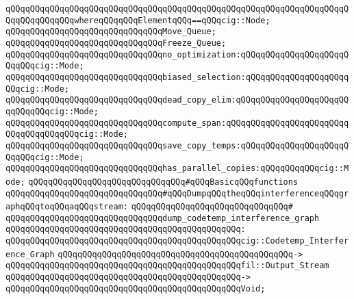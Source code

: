\verb|qQQqqQQqqQQqqQQqqQQqqQQqqQQqqQQqqQQqqQQqqQQqqQQqqQQqqQQqqQQqqQQqqQQqqQQqqQQqqQQqqQQqwhereqQQqqQQqElementqQQq==qQQqcig::Node;|\newline
\newline
\verb|qQQqqQQqqQQqqQQqqQQqqQQqqQQqqQQqMove_Queue;|\newline
\verb|qQQqqQQqqQQqqQQqqQQqqQQqqQQqqQQqFreeze_Queue;|\newline
\newline
\verb|qQQqqQQqqQQqqQQqqQQqqQQqqQQqqQQqno_optimization:qQQqqQQqqQQqqQQqqQQqqQQqqQQqcig::Mode;|\newline
\verb|qQQqqQQqqQQqqQQqqQQqqQQqqQQqqQQqbiased_selection:qQQqqQQqqQQqqQQqqQQqqQQqcig::Mode;|\newline
\verb|qQQqqQQqqQQqqQQqqQQqqQQqqQQqqQQqdead_copy_elim:qQQqqQQqqQQqqQQqqQQqqQQqqQQqqQQqcig::Mode;|\newline
\verb|qQQqqQQqqQQqqQQqqQQqqQQqqQQqqQQqcompute_span:qQQqqQQqqQQqqQQqqQQqqQQqqQQqqQQqqQQqqQQqcig::Mode;|\newline
\verb|qQQqqQQqqQQqqQQqqQQqqQQqqQQqqQQqsave_copy_temps:qQQqqQQqqQQqqQQqqQQqqQQqqQQqcig::Mode;|\newline
\verb|qQQqqQQqqQQqqQQqqQQqqQQqqQQqqQQqhas_parallel_copies:qQQqqQQqqQQqcig::Mode;|\newline
\newline
\newline
\verb|qQQqqQQqqQQqqQQqqQQqqQQqqQQqqQQq#qQQqBasicqQQqfunctions|\newline
\newline
\newline
\verb|qQQqqQQqqQQqqQQqqQQqqQQqqQQqqQQq#qQQqDumpqQQqtheqQQqinterferenceqQQqgraphqQQqtoqQQqaqQQqstream:|\newline
\verb|qQQqqQQqqQQqqQQqqQQqqQQqqQQqqQQq#|\newline
\verb|qQQqqQQqqQQqqQQqqQQqqQQqqQQqqQQqdump_codetemp_interference_graph|\newline
\verb|qQQqqQQqqQQqqQQqqQQqqQQqqQQqqQQqqQQqqQQqqQQqqQQq:|\newline
\verb|qQQqqQQqqQQqqQQqqQQqqQQqqQQqqQQqqQQqqQQqqQQqqQQqcig::Codetemp_Interference_Graph|\newline
\verb|qQQqqQQqqQQqqQQqqQQqqQQqqQQqqQQqqQQqqQQqqQQqqQQq->|\newline
\verb|qQQqqQQqqQQqqQQqqQQqqQQqqQQqqQQqqQQqqQQqqQQqqQQqfil::Output_Stream|\newline
\verb|qQQqqQQqqQQqqQQqqQQqqQQqqQQqqQQqqQQqqQQqqQQqqQQq->|\newline
\verb|qQQqqQQqqQQqqQQqqQQqqQQqqQQqqQQqqQQqqQQqqQQqqQQqVoid;|\newline
